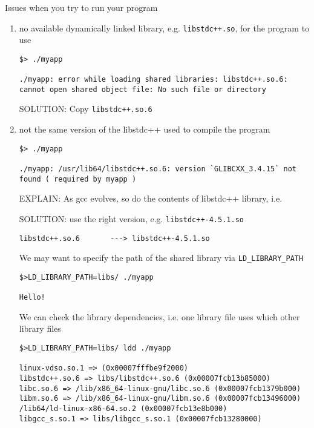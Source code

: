 

Issues when you try to run your program
\begin{enumerate}
  \item no available dynamically linked library, e.g. \verb!libstdc++.so!, for the program to use
  
\begin{verbatim}
$> ./myapp   

./myapp: error while loading shared libraries: libstdc++.so.6: cannot open shared object file: No such file or directory
\end{verbatim}
SOLUTION: Copy \verb!libstdc++.so.6! 


  \item not the same version of the libstdc++ used to compile the program
\begin{verbatim}
$> ./myapp  

./myapp: /usr/lib64/libstdc++.so.6: version `GLIBCXX_3.4.15` not found ( required by myapp )
\end{verbatim}
EXPLAIN:  As gcc evolves, so do the contents of libstdc++ library, i.e. 

SOLUTION: use the right version, e.g. \verb!libstdc++-4.5.1.so!
\begin{verbatim}
libstdc++.so.6       ---> libstdc++-4.5.1.so
\end{verbatim}

We may want to specify the path of the shared library via \verb!LD_LIBRARY_PATH!
\begin{verbatim}
$>LD_LIBRARY_PATH=libs/ ./myapp   

Hello!
\end{verbatim}

We can check the library dependencies, i.e. one library file uses which other
library files
\begin{verbatim}
$>LD_LIBRARY_PATH=libs/ ldd ./myapp  

linux-vdso.so.1 => (0x00007fffbe9f2000) 
libstdc++.so.6 => libs/libstdc++.so.6 (0x00007fcb13b85000) 
libc.so.6 => /lib/x86_64-linux-gnu/libc.so.6 (0x00007fcb1379b000) 
libm.so.6 => /lib/x86_64-linux-gnu/libm.so.6 (0x00007fcb13496000) 
/lib64/ld-linux-x86-64.so.2 (0x00007fcb13e8b000) 
libgcc_s.so.1 => libs/libgcc_s.so.1 (0x00007fcb13280000)
\end{verbatim}


\end{enumerate}
